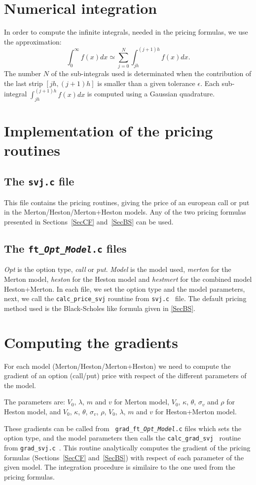 \documentclass[12pt,a4paper]{article}
\def\dps{\displaystyle}
\begin{document}
\section{Numerical integration}
%
In order to compute the infinite integrals, needed in the pricing
formulas, we use the approximation: 
\[ 
\int_0^\infty f(x)dx \simeq \sum_{j=0}^N \int_{jh}^{(j+1)h}f(x)dx.
\]
The number $N$ of the sub-integrals used is determinated when the
contribution of the last strip $[jh,(j+1)h]$ is smaller than a given
tolerance $\epsilon$. Each sub-integral $\dps\int_{jh}^{(j+1)h}f(x)dx$
is computed using a Gaussian quadrature.
%
\section{Implementation of the pricing routines}
\subsection{The {\tt svj.c} file}
This file contains the pricing routines, giving the price of an european
call or put in the Merton/Heston/Merton+Heston models. Any of the two pricing
formulas presented in Sections~\ref{SecCF} and~\ref{SecBS} can be used.
\subsection{The {\tt ft\_\emph{Opt}\_\emph{Model}.c} files}
%
\emph{Opt} is the option type, \emph{call} or \emph{put}. \emph{Model}
is the model used, \emph{merton} for the Merton model, \emph{heston} for
the Heston model and \emph{hestmert} for the combined model
Heston+Merton. 
In each file, we set the option type and the model parameters, next, we
call the {\tt calc\_price\_svj} rountine from {\tt svj.c } file. The
default pricing method used is the Black-Scholes like formula given in
\ref{SecBS}. 
%
\section{Computing the gradients}
%
For each model (Merton/Heston/Merton+Heston) we need to compute the
gradient of an option (call/put) price with respect of the different
parameters of the model. 

The parameters are: $V_0$, $\lambda$, $m$ and
$v$ for Merton model, $V_0$, $\kappa$, $\theta$, $\sigma_v$ and $\rho$
for Heston model, and $V_0$, $\kappa$, $\theta$, $\sigma_v$, $\rho$,
$V_0$, $\lambda$, $m$ and $v$ for Heston+Merton model. 

These gradients can be called from {\tt
  grad\_ft\_\emph{Opt}\_\emph{Model}.c} files
which sets the option type, and the model parameters then calls the
{\tt calc\_grad\_svj } routine from {\tt  grad\_svj.c }. This routine
analytically computes the gradient of the pricing formulas (Sections~\ref{SecCF}
and~\ref{SecBS})  with respect of each parameter of the given
model. The integration procedure is similaire to the one used from the
pricing formulas.  
%
\end{document}
